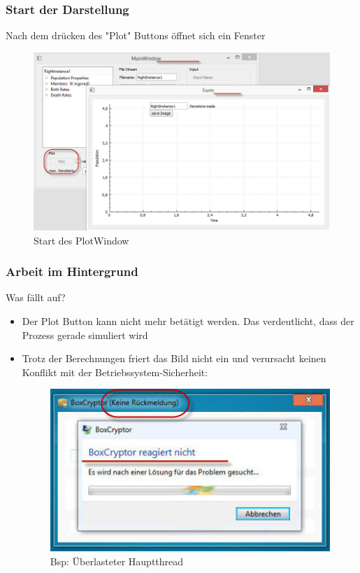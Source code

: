 \documentclass{beamer}
\begin{document}
		\begin{frame}
			\frametitle{Start der Darstellung}
			Nach dem drücken des "{}Plot"{} Buttons öffnet sich ein Fenster
			\pause
			\begin{figure}[H]
				\centering
				\includegraphics[width=0.8\linewidth]{./PlotWindow_start}
				\caption[PlotWindow_start]{Start des PlotWindow}
				\label{PlotWindow_start}
			\end{figure}
		\end{frame}
		\begin{frame}
			\frametitle{Arbeit im Hintergrund}
			Was fällt auf?
			\begin{itemize}
				\item Der Plot Button kann nicht mehr betätigt werden. Das verdeutlicht, dass der Prozess gerade simuliert wird
				\pause
				\item Trotz der Berechnungen friert das Bild nicht ein und verursacht keinen Konflikt mit der Betriebssystem-Sicherheit:
				\pause
				\begin{figure}[H]
					\centering
					\includegraphics[width=0.6\linewidth]{./KeineRueckmeldungSmall}
					\caption[Keine Rueckmeldung]{Bsp: Überlasteter Hauptthread}
					\label{Keine Rueckmeldung}
				\end{figure}
			\end{itemize}
		\end{frame}
\end{document}
